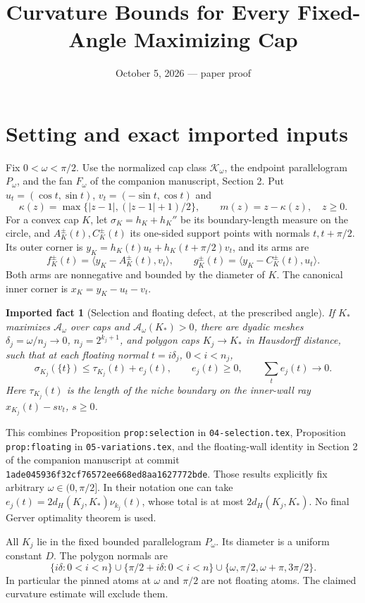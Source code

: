 \documentclass[11pt]{article}
\title{Curvature Bounds for Every Fixed-Angle Maximizing Cap}
\author{}\date{October 5, 2026 --- paper proof}
\newtheorem{fact}[theorem]{Imported fact}
\newcommand{\ip}[2]{\langle #1,#2\rangle}
\begin{document}
\maketitle

\section{Setting and exact imported inputs}
Fix $0<\omega<\pi/2$. Use the normalized cap class $\mathcal K_\omega$, the endpoint parallelogram $P_\omega$, and the fan $F_\omega$ of the companion manuscript, Section 2. Put $u_t=(\cos t,\sin t)$, $v_t=(-\sin t,\cos t)$ and
\[
 \kappa(z)=\max\{|z-1|,(|z-1|+1)/2\},\qquad m(z)=z-\kappa(z),\quad z\ge0.
\]
For a convex cap $K$, let $\sigma_K=h_K+h_K''$ be its boundary-length measure on the circle, and $A_K^\pm(t),C_K^\pm(t)$ its one-sided support points with normals $t,t+\pi/2$. Its outer corner is $y_K=h_K(t)u_t+h_K(t+\pi/2)v_t$, and its arms are
\[
 f_K^\pm(t)=\ip{y_K-A_K^\pm(t)}{v_t},\qquad
 g_K^\pm(t)=\ip{y_K-C_K^\pm(t)}{u_t}.
\]
Both arms are nonnegative and bounded by the diameter of $K$. The canonical inner corner is $x_K=y_K-u_t-v_t$.

\begin{fact}[Selection and floating defect, at the prescribed angle]\label{fact:selection}
If $K_*$ maximizes $\mathcal A_\omega$ over caps and $\mathcal A_\omega(K_*)>0$, there are dyadic meshes $\delta_j=\omega/n_j\to0$, $n_j=2^{k_j+1}$, and polygon caps $K_j\to K_*$ in Hausdorff distance, such that at each floating normal $t=i\delta_j$, $0<i<n_j$,
\[
 \sigma_{K_j}(\{t\})\le\tau_{K_j}(t)+e_j(t),\qquad e_j(t)\ge0,\qquad\sum_t e_j(t)\to0.
\]
Here $\tau_{K_j}(t)$ is the length of the niche boundary on the inner-wall ray $x_{K_j}(t)-s v_t$, $s\ge0$.
\end{fact}
This combines Proposition \texttt{prop:selection} in \texttt{04-selection.tex}, Proposition \texttt{prop:floating} in \texttt{05-variations.tex}, and the floating-wall identity in Section 2 of the companion manuscript at commit \texttt{1ade045936f32cf76572ee668ed8aa1627772bde}. Those results explicitly fix arbitrary $\omega\in(0,\pi/2]$. In their notation one can take $e_j(t)=2d_H(K_j,K_*)\nu_{k_j}(t)$, whose total is at most $2d_H(K_j,K_*)$. No final Gerver optimality theorem is used.

All $K_j$ lie in the fixed bounded parallelogram $P_\omega$. Its diameter is a uniform constant $D$. The polygon normals are
\[
 \{i\delta:0<i<n\}\cup\{\pi/2+i\delta:0<i<n\}
 \cup\{\omega,\pi/2,\omega+\pi,3\pi/2\}.
\]
In particular the pinned atoms at $\omega$ and $\pi/2$ are not floating atoms. The claimed curvature estimate will exclude them.
\end{document}
